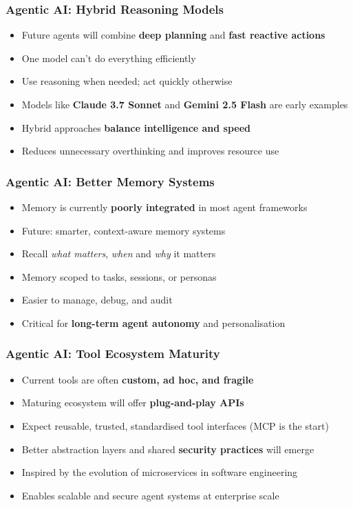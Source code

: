 \begin{frame}[fragile]\frametitle{Agentic AI: Hybrid Reasoning Models}
      \begin{itemize}
        \item Future agents will combine \textbf{deep planning} and \textbf{fast reactive actions}
        \item One model can't do everything efficiently
        \item Use reasoning when needed; act quickly otherwise
        \item Models like \textbf{Claude 3.7 Sonnet} and \textbf{Gemini 2.5 Flash} are early examples
        \item Hybrid approaches \textbf{balance intelligence and speed}
        \item Reduces unnecessary overthinking and improves resource use
      \end{itemize}
\end{frame}

\begin{frame}[fragile]\frametitle{Agentic AI: Better Memory Systems}
      \begin{itemize}
        \item Memory is currently \textbf{poorly integrated} in most agent frameworks
        \item Future: smarter, context-aware memory systems
        \item Recall \emph{what matters}, \emph{when} and \emph{why} it matters
        \item Memory scoped to tasks, sessions, or personas
        \item Easier to manage, debug, and audit
        \item Critical for \textbf{long-term agent autonomy} and personalisation
      \end{itemize}
\end{frame}

\begin{frame}[fragile]\frametitle{Agentic AI: Tool Ecosystem Maturity}
      \begin{itemize}
        \item Current tools are often \textbf{custom, ad hoc, and fragile}
        \item Maturing ecosystem will offer \textbf{plug-and-play APIs}
        \item Expect reusable, trusted, standardised tool interfaces (MCP is the start)
        \item Better abstraction layers and shared \textbf{security practices} will emerge
        \item Inspired by the evolution of microservices in software engineering
        \item Enables scalable and secure agent systems at enterprise scale
      \end{itemize}
\end{frame}


